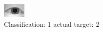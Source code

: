 \begin{figure}[h!]
\begin{center}
\includegraphics[width=0.60\columnwidth]{figures/ID935_class_1_target_2.png}
\end{center}
\caption{ Classification: 1 actual target: 2}
\label{fig:ID935_class_1_target_2}
\end{figure}
